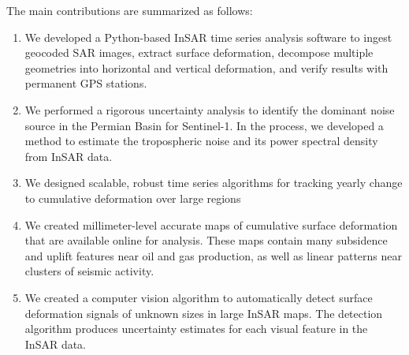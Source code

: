 \documentclass{utexasthesis}
\begin{document}


The main contributions are summarized as follows:

\begin{enumerate}

\item We developed a Python-based InSAR time series analysis software to ingest geocoded SAR images, extract surface deformation, decompose multiple geometries into horizontal and vertical deformation, and verify results with permanent GPS stations.


\item We performed a rigorous uncertainty analysis to identify the dominant noise source in the Permian Basin for Sentinel-1.  In the process, we developed a method to estimate the tropospheric noise and its power spectral density from InSAR data.




\item We designed scalable, robust time series algorithms for tracking yearly change to  cumulative deformation over large regions

\item We created millimeter-level accurate maps of cumulative surface deformation that are available online for analysis. These maps contain many subsidence and uplift features near oil and gas production, as well as linear patterns near clusters of seismic activity.


\item We created a computer vision algorithm to automatically detect surface deformation signals of unknown sizes in large InSAR maps. The detection algorithm produces uncertainty estimates for each visual feature in the InSAR data.



\end{enumerate}
\end{document}
